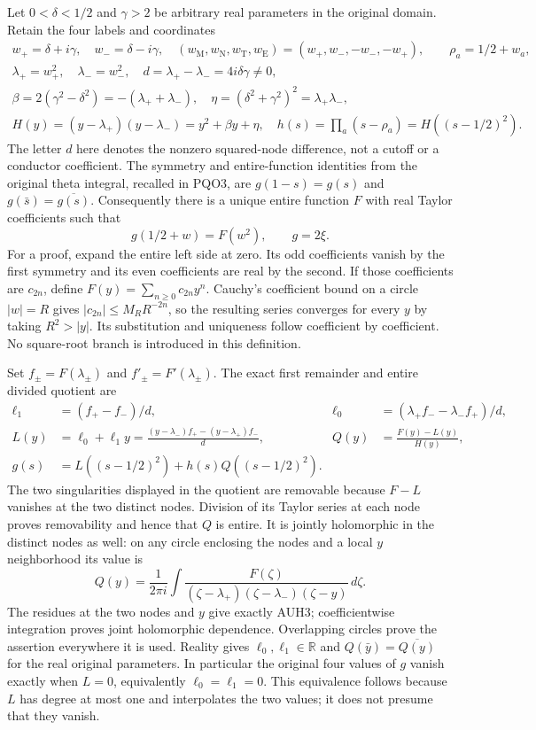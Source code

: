 Let $0<\delta<1/2$ and $\gamma>2$ be arbitrary real parameters in
the original domain.  Retain the four labels and coordinates
\[
\begin{gathered}
 w_+=\delta+i\gamma,\quad w_-=\delta-i\gamma,\quad
 (w_{\mathrm M},w_{\mathrm N},w_{\mathrm T},w_{\mathrm E})
                  =(w_+,w_-,-w_-,-w_+),\qquad \rho_a=1/2+w_a,\\
 \lambda_+=w_+^2,\quad\lambda_-=w_-^2,\quad
 d=\lambda_+-\lambda_-=4i\delta\gamma\ne0,\\
 \beta=2(\gamma^2-\delta^2)=-(\lambda_++\lambda_-),\quad
 \eta=(\delta^2+\gamma^2)^2=\lambda_+\lambda_-,\\
 H(y)=(y-\lambda_+)(y-\lambda_-)=y^2+\beta y+\eta,\quad
 h(s)=\prod_a(s-\rho_a)=H((s-1/2)^2).
\end{gathered}\tag{AUH1}
\]
The letter $d$ here denotes the nonzero squared-node difference, not
a cutoff or a conductor coefficient.  The symmetry and entire-function
identities from the original theta integral, recalled in PQO3, are
$g(1-s)=g(s)$ and $g(\bar s)=\overline{g(s)}$.
Consequently there is a unique entire function $F$ with real Taylor
coefficients such that
\[
 g(1/2+w)=F(w^2),\qquad g=2\xi.
 \tag{AUH2}
\]
For a proof, expand the entire left side at zero.  Its odd coefficients
vanish by the first symmetry and its even coefficients are real by the
second.  If those coefficients are $c_{2n}$, define
$F(y)=\sum_{n\ge0}c_{2n}y^n$.  Cauchy's coefficient bound on a
circle $|w|=R$ gives $|c_{2n}|\le M_RR^{-2n}$, so the resulting
series converges for every $y$ by taking $R^2>|y|$.
Its substitution and uniqueness follow coefficient by coefficient.
No square-root branch is introduced in this definition.

Set $f_\pm=F(\lambda_\pm)$ and $f'_\pm=F'(\lambda_\pm)$.
The exact first remainder and entire divided quotient are
\[
\begin{aligned}
 \ell_1&=(f_+-f_-)/d,&
 \ell_0&=(\lambda_+f_--\lambda_-f_+)/d,\\
 L(y)&=\ell_0+\ell_1y
 =\frac{(y-\lambda_-)f_+-(y-\lambda_+)f_-}{d},&
 Q(y)&=\frac{F(y)-L(y)}{H(y)},\\
 g(s)&=L((s-1/2)^2)+h(s)Q((s-1/2)^2).
\end{aligned}\tag{AUH3}
\]
The two singularities displayed in the quotient are removable because
$F-L$ vanishes at the two distinct nodes.  Division of its Taylor
series at each node proves removability and hence that $Q$ is entire.
It is jointly holomorphic in the distinct nodes as well: on any circle
enclosing the nodes and a local $y$ neighborhood its value is
\[
 Q(y)=\frac1{2\pi i}\int
 \frac{F(\zeta)}{(\zeta-\lambda_+)(\zeta-\lambda_-)(\zeta-y)}
 \,d\zeta.
 \tag{AUH4}
\]
The residues at the two nodes and $y$ give exactly AUH3;
coefficientwise integration proves joint holomorphic dependence.
Overlapping circles prove the assertion everywhere it is used.
Reality gives $\ell_0,\ell_1\in\mathbb R$ and
$Q(\bar y)=\overline{Q(y)}$ for the real original parameters.
In particular the original four values of $g$ vanish exactly when
$L=0$, equivalently $\ell_0=\ell_1=0$.
This equivalence follows because $L$ has degree at most one and
interpolates the two values; it does not presume that they vanish.


